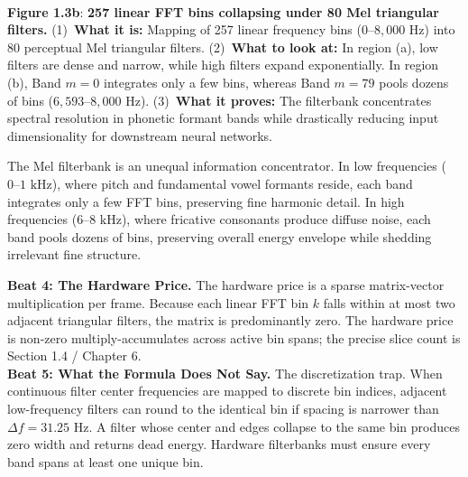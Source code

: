 \documentclass[11pt,a4paper]{article}
\begin{document}
\vspace{-3mm}
\begin{center}
\begin{minipage}{\textwidth}
\centering
\resizebox{0.94\textwidth}{!}{}\\[0.8mm]
\begin{minipage}{0.96\textwidth}
\small\textbf{Figure 1.3b}: \textbf{257 linear FFT bins collapsing under 80 Mel triangular filters.} (1)~\textbf{What it is:} Mapping of 257 linear frequency bins ($0\text{--}8{,}000\text{ Hz}$) into 80 perceptual Mel triangular filters. (2)~\textbf{What to look at:} In region (a), low filters are dense and narrow, while high filters expand exponentially. In region (b), Band $m=0$ integrates only a few bins, whereas Band $m=79$ pools dozens of bins ($6{,}593\text{--}8{,}000\text{ Hz}$). (3)~\textbf{What it proves:} The filterbank concentrates spectral resolution in phonetic formant bands while drastically reducing input dimensionality for downstream neural networks.
\end{minipage}
\end{minipage}
\end{center}
\vspace{-3.5mm}

\begin{physicalinsight}
The Mel filterbank is an unequal information concentrator. In low frequencies ($0\text{--}1\text{ kHz}$), where pitch and fundamental vowel formants reside, each band integrates only a few FFT bins, preserving fine harmonic detail. In high frequencies ($6\text{--}8\text{ kHz}$), where fricative consonants produce diffuse noise, each band pools dozens of bins, preserving overall energy envelope while shedding irrelevant fine structure.
\end{physicalinsight}

\vspace{1mm}
{\small
\textbf{Beat 4: The Hardware Price.} The hardware price is a sparse matrix-vector multiplication per frame. Because each linear FFT bin $k$ falls within at most two adjacent triangular filters, the matrix is predominantly zero. The hardware price is non-zero multiply-accumulates across active bin spans; the precise slice count is Section 1.4 / Chapter 6.\\[1mm]
\textbf{Beat 5: What the Formula Does Not Say.} The discretization trap. When continuous filter center frequencies are mapped to discrete bin indices, adjacent low-frequency filters can round to the identical bin if spacing is narrower than $\Delta f = 31.25\text{ Hz}$. A filter whose center and edges collapse to the same bin produces zero width and returns dead energy. Hardware filterbanks must ensure every band spans at least one unique bin.
}
\end{document}
